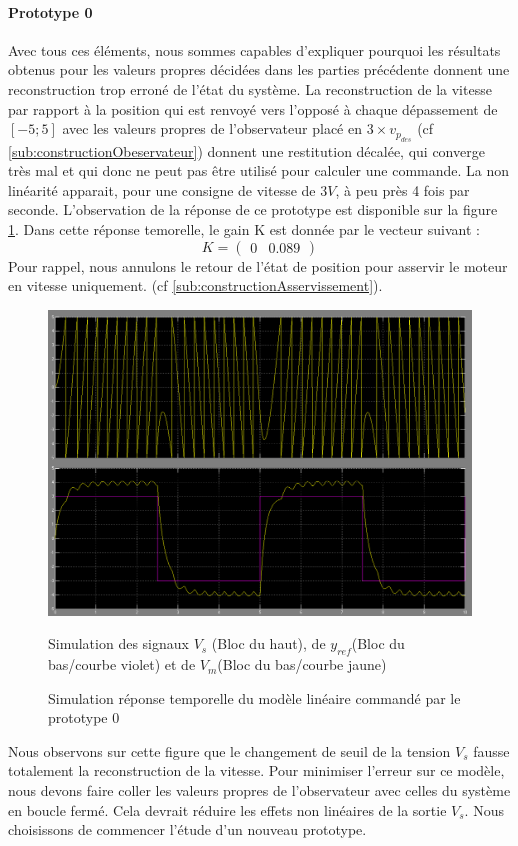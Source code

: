 \paragraph{Prototype 0}			
Avec tous ces éléments, nous sommes capables d'expliquer pourquoi les résultats obtenus pour les valeurs propres décidées dans les parties précédente donnent une reconstruction trop erroné de l'état du système. La reconstruction de la vitesse par rapport à la position qui est renvoyé vers l'opposé à chaque dépassement de $[-5;5]$ avec les valeurs propres de l'observateur placé en $3\times v_{p_{des}}$ (cf \ref{sub:constructionObeservateur}) donnent une restitution décalée, qui converge très mal et qui donc ne peut pas être utilisé pour calculer une commande. La non linéarité apparait, pour une consigne de vitesse de $3V$, à peu près 4 fois par seconde. L'observation de la réponse de ce prototype est disponible sur la figure \ref{fig:repNL_proto0}. Dans cette réponse temorelle, le gain K est donnée par le vecteur suivant :
\begin{equation}\label{eqn:gainRetourEtat}
K = \begin{pmatrix}
0& 0.089
\end{pmatrix}
\end{equation}
Pour rappel, nous annulons le retour de l'état de position pour asservir le moteur en vitesse uniquement. (cf \ref{sub:constructionAsservissement}).
\begin{figure}[!ht]
\centering
\includegraphics[width = .8\textwidth]{./IV/images/NL_simulation_observateurtropRapide.PNG}
\caption{Simulation réponse temporelle du modèle linéaire commandé par le prototype 0\label{fig:repNL_proto0}}
Simulation des signaux $V_s$ (Bloc du haut), de $y_{ref}$(Bloc du bas/courbe violet) et de $V_m$(Bloc du bas/courbe jaune)
\end{figure}
Nous observons sur cette figure que le changement de seuil de la tension $V_s$ fausse totalement la reconstruction de la vitesse. Pour minimiser l'erreur sur ce modèle, nous devons faire coller les valeurs propres de l'observateur avec celles du système en boucle fermé. Cela devrait réduire les effets non linéaires de la sortie $V_s$. Nous choisissons de commencer l'étude d'un nouveau prototype.


